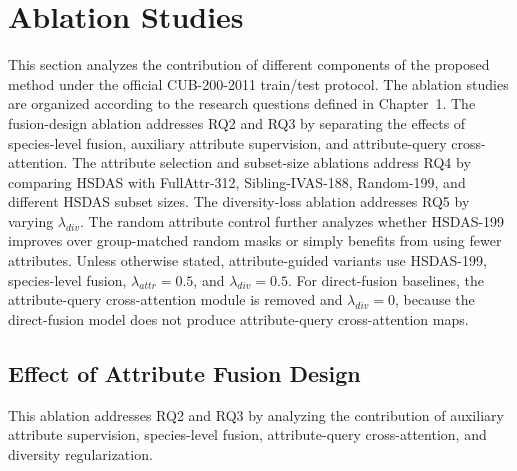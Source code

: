 \section{Ablation Studies}

This section analyzes the contribution of different components of the proposed method under the official CUB-200-2011 train/test protocol. The ablation studies are organized according to the research questions defined in Chapter~1. The fusion-design ablation addresses RQ2 and RQ3 by separating the effects of species-level fusion, auxiliary attribute supervision, and attribute-query cross-attention. The attribute selection and subset-size ablations address RQ4 by comparing HSDAS with FullAttr-312, Sibling-IVAS-188, Random-199, and different HSDAS subset sizes. The diversity-loss ablation addresses RQ5 by varying \(\lambda_{div}\). The random attribute control further analyzes whether HSDAS-199 improves over group-matched random masks or simply benefits from using fewer attributes.
Unless otherwise stated, attribute-guided variants use HSDAS-199, species-level fusion, \(\lambda_{attr}=0.5\), and \(\lambda_{div}=0.5\). For direct-fusion baselines, the attribute-query cross-attention module is removed and \(\lambda_{div}=0\), because the direct-fusion model does not produce attribute-query cross-attention maps.








\subsection{Effect of Attribute Fusion Design}

This ablation addresses RQ2 and RQ3 by analyzing the contribution of auxiliary attribute supervision, species-level fusion, attribute-query cross-attention, and diversity regularization.

